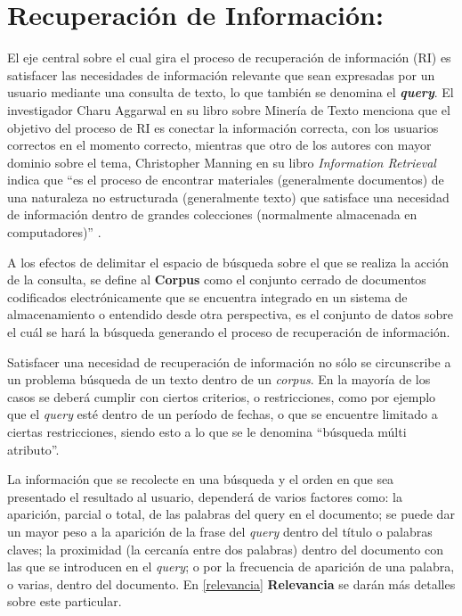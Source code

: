 \documentclass[
  12pt,
  openany]{book}
\begin{document}
\hypertarget{infret}{%
\section{Recuperación de Información:}\label{infret}}

El eje central sobre el cual gira el proceso de recuperación de información (RI) es satisfacer las necesidades de información relevante que sean expresadas por un usuario mediante una consulta de texto, lo que también se denomina el \textbf{\emph{query}}. El investigador Charu Aggarwal en su libro sobre Minería de Texto \citep{miningt2012} menciona que el objetivo del proceso de RI es conectar la información correcta, con los usuarios correctos en el momento correcto, mientras que otro de los autores con mayor dominio sobre el tema, Christopher Manning en su libro \emph{Information Retrieval} indica que ``es el proceso de encontrar materiales (generalmente documentos) de una naturaleza no estructurada (generalmente texto) que satisface una necesidad de información dentro de grandes colecciones (normalmente almacenada en computadores)'' \citep{manning2008}.

A los efectos de delimitar el espacio de búsqueda sobre el que se realiza la acción de la consulta, se define al \textbf{Corpus} como el conjunto cerrado de documentos codificados electrónicamente que se encuentra integrado en un sistema de almacenamiento \citep{martiaurora} o entendido desde otra perspectiva, es el conjunto de datos sobre el cuál se hará la búsqueda generando el proceso de recuperación de información.

Satisfacer una necesidad de recuperación de información no sólo se circunscribe a un problema búsqueda de un texto dentro de un \emph{corpus}. En la mayoría de los casos se deberá cumplir con ciertos criterios, o restricciones, como por ejemplo que el \emph{query} esté dentro de un período de fechas, o que se encuentre limitado a ciertas restricciones, siendo esto a lo que se le denomina ``búsqueda múlti atributo''.

La información que se recolecte en una búsqueda y el orden en que sea presentado el resultado al usuario, dependerá de varios factores como: la aparición, parcial o total, de las palabras del query en el documento; se puede dar un mayor peso a la aparición de la frase del \emph{query} dentro del título o palabras claves; la proximidad (la cercanía entre dos palabras) dentro del documento con las que se introducen en el \emph{query}; o por la frecuencia de aparición de una palabra, o varias, dentro del documento. En \ref{relevancia} \textbf{Relevancia} se darán más detalles sobre este particular.
\end{document}
